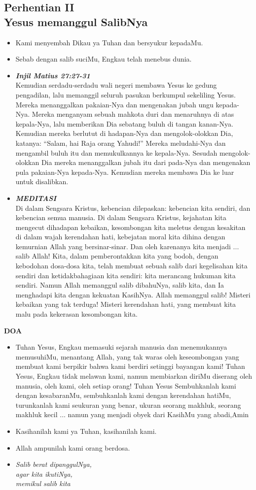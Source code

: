 \documentclass[a5paper,titlepage,11pt,openany]{scrbook}
\newcommand{\BU}[1]{\begin{itemize} \item[U:] #1 \end{itemize}}
\newcommand{\BP}[1]{\begin{itemize} \item[P:] #1 \end{itemize}}
\newcommand{\kamiMenyembah}{\BP{ Kami menyembah Dikau ya Tuhan dan bersyukur kepadaMu.}
\BU{Sebab dengan salib suciMu, Engkau telah menebus dunia.}
}
\newcommand{\kasihanilahKami}{\BP{Kasihanilah kami ya Tuhan, kasihanilah kami.}
\BU{Allah ampunilah kami orang berdosa.}}
\newcommand{\BPi}[2]
{\begin{itemize} \item[P1:] \textbf{\emph{#1}}\\#2 \end{itemize}}
\newcommand{\BPii}[1]
{\begin{itemize} \item[P2:] \textbf{\emph{MEDITASI}}\\#1 \end{itemize}}
\newcommand{\lagu}[2]{%
\begin{itemize}
\item[#1.] \it{#2}
\end{itemize}}
\newcommand{\henti}[2]{%
\subsection*{Perhentian #1\\#2 } 
\kamiMenyembah
}
\begin{document}
\henti{II}{Yesus memanggul SalibNya}

\BPi{Injil Matius 27:27-31}{%
Kemudian serdadu-serdadu wali negeri membawa Yesus ke gedung pengadilan, lalu memanggil seluruh pasukan berkumpul sekeliling Yesus. Mereka menanggalkan pakaian-Nya dan mengenakan jubah ungu kepada-Nya. Mereka menganyam sebuah mahkota duri dan menaruhnya di atas kepala-Nya, lalu memberikan Dia sebatang buluh di tangan kanan-Nya. Kemudian mereka berlutut di hadapan-Nya dan mengolok-olokkan Dia, katanya: ``Salam, hai Raja orang Yahudi!'' Mereka meludahi-Nya dan mengambil buluh itu dan memukulkannya ke kepala-Nya. Sesudah mengolok-olokkan Dia mereka menanggalkan jubah itu dari pada-Nya dan mengenakan pula pakaian-Nya kepada-Nya. Kemudian mereka membawa Dia ke luar untuk disalibkan.}

\BPii{
Di dalam Sengsara Kristus, kebencian dilepaskan: kebencian kita sendiri, dan kebencian semua manusia. Di dalam Sengsara Kristus, kejahatan kita mengecut dihadapan kebaikan, kesombongan kita meletus dengan kesakitan di dalam wajah kerendahan hati, kebejatan moral kita dihina dengan kemurnian Allah yang bersinar-sinar. Dan oleh karenanya kita menjadi ... salib Allah! Kita, dalam pemberontakkan kita yang bodoh, dengan kebodohan dosa-dosa kita, telah membuat sebuah salib dari kegelisahan kita sendiri dan ketidakbahagiaan kita sendiri: kita merancang hukuman kita sendiri. Namun Allah memanggul salib dibahuNya, salib kita, dan Ia menghadapi kita dengan kekuatan KasihNya. Allah memanggul salib! Misteri kebaikan yang tak terduga! Misteri kerendahan hati, yang membuat kita malu pada kekerasan kesombongan kita.}


\textbf{DOA }


\BU{Tuhan Yesus, Engkau memasuki sejarah manusia dan menemukannya memusuhiMu,  menantang Allah, yang tak waras oleh keseombongan yang membuat kami berpikir bahwa kami berdiri setinggi bayangan kami! Tuhan Yesus, Engkau tidak melawan kami, namun membiarkan diriMu diserang oleh manusia, oleh kami, oleh setiap orang! Tuhan Yesus Sembuhkanlah kami dengan kesabaranMu, sembuhkanlah kami dengan kerendahan hatiMu, turunkanlah kami seukuran yang benar, ukuran seorang makhluk, seorang makhluk kecil ... namun yang menjadi obyek dari KasihMu yang abadi,Amin }

\kasihanilahKami

\lagu{3}{Salib berat dipanggulNya,\\
agar kita ikutiNya,\\
memikul salib kita}
\end{document}
